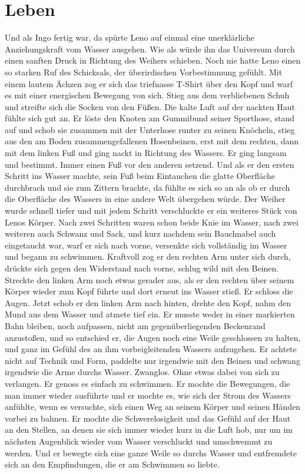 \documentclass[ngerman,smalldemyvopaper,11pt,oneside,onecolumn,openright,extrafontsizes]{memoir}
\begin{document}
\chapter{Leben}
Und als Ingo fertig war, da spürte Leno auf einmal eine unerklärliche Anziehungskraft vom Wasser ausgehen. Wie als würde ihn das Universum durch einen sanften Druck in Richtung des Weihers schieben. Noch nie hatte Leno einen so starken Ruf des Schicksals, der überirdischen Vorbestimmung gefühlt. Mit einem lautem Ächzen zog er sich das triefnasse T-Shirt über den Kopf und warf es mit einer energischen Bewegung von sich. Stieg aus dem verbliebenen Schuh und streifte sich die Socken von den Füßen. Die kalte Luft auf der nackten Haut fühlte sich gut an. Er löste den Knoten am Gummibund seiner Sporthose, stand auf und schob sie zusammen mit der Unterhose runter zu seinen Knöcheln, stieg aus den am Boden zusammengefallenen Hosenbeinen, erst mit dem rechten, dann mit dem linken Fuß und ging nackt in Richtung des Wassers. Er ging langsam und bestimmt. Immer einen Fuß vor den anderen setzend. Und als er den ersten Schritt ins Wasser machte, sein Fuß beim Eintauchen die glatte Oberfläche durchbrach und sie zum Zittern brachte, da fühlte es sich so an als ob er durch die Oberfläche des Wassers in eine andere Welt übergehen würde. Der Weiher wurde schnell tiefer und mit jedem Schritt verschluckte er ein weiteres Stück von Lenos Körper. Nach zwei Schritten waren schon beide Knie im Wasser, nach zwei weiteren auch Schwanz und Sack, und kurz nachdem sein Bauchnabel auch eingetaucht war, warf er sich nach vorne, versenkte sich vollständig im Wasser und begann zu schwimmen. Kraftvoll zog er den rechten Arm unter sich durch, drückte sich gegen den Widerstand nach vorne, schlug wild mit den Beinen. Streckte den linken Arm noch etwas gerader aus, als er den rechten über seinem Körper wieder zum Kopf führte und dort erneut ins Wasser stieß. Er schloss die Augen. Jetzt schob er den linken Arm nach hinten, drehte den Kopf, nahm den Mund aus dem Wasser und atmete tief ein. Er musste weder in einer markierten Bahn bleiben, noch aufpassen, nicht am gegenüberliegenden Beckenrand anzustoßen, und so entschied er, die Augen noch eine Weile geschlossen zu halten, und ganz im Gefühl des an ihm vorbeigleitenden Wassers aufzugehen. Er achtete nicht auf Technik und Form, paddelte nur irgendwie mit den Beinen und schwang irgendwie die Arme durchs Wasser. Zwanglos. Ohne etwas dabei von sich zu verlangen. Er genoss es einfach zu schwimmen. Er mochte die Bewegungen, die man immer wieder ausführte und er mochte es, wie sich der Strom des Wassers anfühlte, wenn es versuchte, sich einen Weg an seinem Körper und seinen Händen vorbei zu bahnen. Er mochte die Schwerelosigkeit und das Gefühl auf der Haut an den Stellen, an denen sie sich immer wieder kurz in die Luft hob, nur um im nächsten Augenblick wieder vom Wasser verschluckt und umschwemmt zu werden. Und er bewegte sich eine ganze Weile so durchs Wasser und entfremdete sich an den Empfindungen, die er am Schwimmen so liebte.
\end{document}
